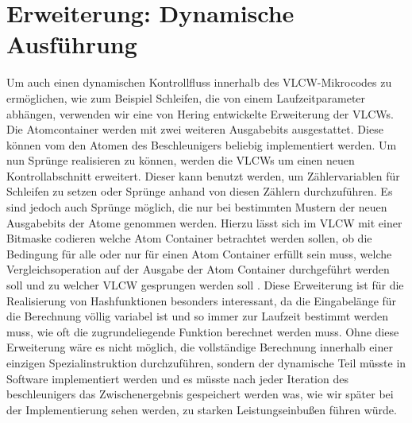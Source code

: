 \section{Erweiterung: Dynamische Ausführung}
Um auch einen dynamischen Kontrollfluss innerhalb des VLCW-Mikrocodes zu ermöglichen, wie zum Beispiel Schleifen, die von einem Laufzeitparameter abhängen,
verwenden wir eine von Hering \cite{hering2020} entwickelte Erweiterung der VLCWs. Die Atomcontainer werden mit zwei weiteren Ausgabebits ausgestattet.
Diese können vom den Atomen des Beschleunigers beliebig implementiert werden. Um nun Sprünge realisieren zu können, werden die VLCWs um einen neuen Kontrollabschnitt erweitert.
Dieser kann benutzt werden, um Zählervariablen für Schleifen zu setzen oder Sprünge anhand von diesen Zählern durchzuführen. Es sind jedoch auch Sprünge möglich,
die nur bei bestimmten Mustern der neuen Ausgabebits der Atome genommen werden. Hierzu lässt sich im VLCW mit einer Bitmaske codieren welche Atom Container betrachtet werden sollen,
ob die Bedingung für alle oder nur für einen Atom Container erfüllt sein muss, welche Vergleichsoperation auf der Ausgabe der Atom Container durchgeführt werden soll und
zu welcher VLCW gesprungen werden soll \cite{hering2020}. Diese Erweiterung ist für die Realisierung von Hashfunktionen besonders interessant,
da die Eingabelänge für die Berechnung völlig variabel ist und so immer zur Laufzeit bestimmt werden muss, wie oft die zugrundeliegende Funktion berechnet werden muss.
Ohne diese Erweiterung wäre es nicht möglich, die vollständige Berechnung innerhalb einer einzigen Spezialinstruktion durchzuführen, sondern der dynamische Teil müsste
in Software implementiert werden und es müsste nach jeder Iteration des beschleunigers das Zwischenergebnis gespeichert werden was, wie wir später bei der Implementierung
sehen werden, zu starken Leistungseinbußen führen würde.